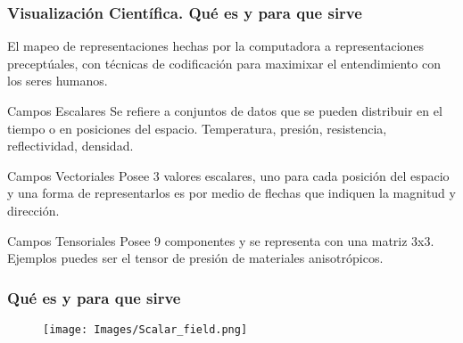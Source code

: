 \documentclass{beamer}
\begin{document}
\begin{frame}
\frametitle{Visualizaci\' on Cient\' ifica. Qu\' e es y para que sirve}
El mapeo de representaciones hechas por la computadora a representaciones precept\' uales, con t\' ecnicas de codificaci\' on para maximixar el entendimiento  con los seres humanos.

\begin{block}{Campos Escalares}
Se refiere a conjuntos de datos que se pueden distribuir en el tiempo o en posiciones del espacio. Temperatura, presi\' on, resistencia, reflectividad, densidad.
\end{block}

\end{frame}
\begin{frame}



\begin{block}{Campos Vectoriales }
Posee 3 valores escalares, uno para cada posici\' on del espacio y una forma de representarlos es por medio de flechas que indiquen la magnitud y direcci\' on. 
\end{block}
\begin{figure}
\end{figure}

\end{frame}

\begin{frame}


\begin{block}{Campos Tensoriales}
Posee 9 componentes y se representa con una matriz 3x3. Ejemplos puedes ser el tensor de presi\' on de materiales anisotr\' opicos.
\end{block}



\frametitle{Qu\' e es y para que sirve}
\begin{figure}[h]
\texttt{[image: Images/Scalar\_field.png]}
\centering
\end{figure}

\end{frame}
\end{document}
